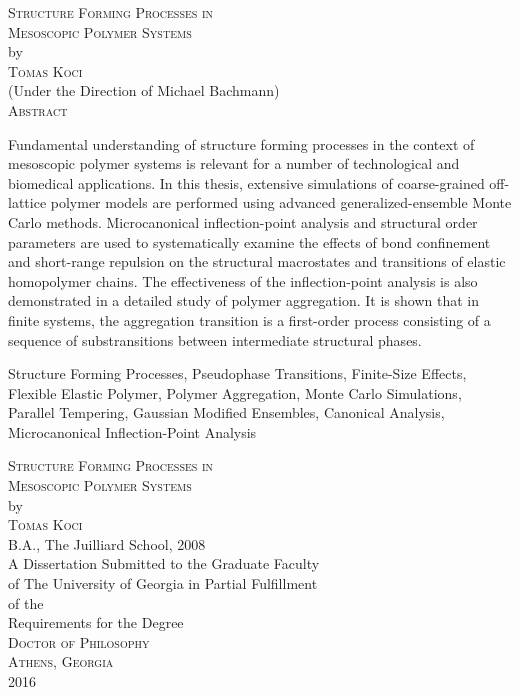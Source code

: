\documentclass[12pt]{report}
\begin{document}
\newpage
\thispagestyle{empty}
\vspace*{18pt}
\begin{center}
\textsc{Structure Forming Processes in\\Mesoscopic Polymer Systems}\\[18pt]
by\\[18pt]
\textsc{Tomas Koci}\\[12pt]
(Under the Direction of Michael Bachmann)\\[12pt]
\textsc{Abstract}
\end{center}
Fundamental understanding of structure forming processes in the context of mesoscopic polymer systems is relevant for a number of technological and biomedical applications. In this thesis, extensive simulations of coarse-grained off-lattice polymer models are performed using advanced generalized-ensemble Monte Carlo methods. Microcanonical inflection-point analysis and structural order parameters are used to systematically examine the effects of bond confinement and short-range repulsion on the structural macrostates and transitions of elastic homopolymer chains. The effectiveness of the inflection-point analysis is also demonstrated in a detailed study of polymer aggregation. It is shown that in finite systems, the aggregation transition is a first-order process consisting of a sequence of substransitions between intermediate structural phases.



\begin{list}{\sc Index words:\hfill}{\leftmargin 1.4in}
\item 
\begin{flushleft}\singlespacing
Structure Forming Processes,
Pseudophase Transitions,
Finite-Size Effects,
Flexible Elastic Polymer,
Polymer Aggregation,
Monte Carlo Simulations,
Parallel Tempering,
Gaussian Modified Ensembles,
Canonical Analysis, 
Microcanonical Inflection-Point Analysis
\end{flushleft}
\end{list}



\newpage
\thispagestyle{empty}
\vspace*{18pt}
\begin{center}
\textsc{Structure Forming Processes in\\Mesoscopic Polymer Systems}\\[18pt]
by\\[18pt]
\textsc{Tomas Koci}\\[12pt]
B.A., The Juilliard School, 2008\\
\vfill
A Dissertation Submitted to the Graduate Faculty \\
of The University of Georgia in Partial Fulfillment \\
of the \\
Requirements for the Degree \\[10pt]
\textsc{Doctor of Philosophy}\\[36pt]
\textsc{Athens, Georgia}\\[18pt]
2016
\end{center}
\end{document}
